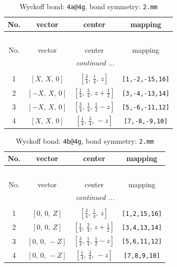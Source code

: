 \documentclass[fleqn,8pt]{jsarticle}
\begin{document}
\begin{longtable}{cccc}
\caption{Wyckoff bond: {\tt 4a@4g}, bond symmetry: {\tt 2.mm}}
 \\
 \hline \hline
No. & vector & center & mapping \\ \hline \endfirsthead

\multicolumn{3}{l}{\tablename\ \thetable{}} \\
 \hline \hline
No. & vector & center & mapping \\ \hline \endhead

 \hline \hline
\multicolumn{3}{r}{\footnotesize\it continued ...} \\ \endfoot

 \hline \hline
\multicolumn{3}{r}{} \\ \endlastfoot

1 & $\left[ X,\, X,\, 0 \right]$ & $\left[ \frac{3}{4},\, \frac{1}{4},\, z \right]$ & {\tt [1,-2,-15,16]} \\ \hline
2 & $\left[ - X,\, X,\, 0 \right]$ & $\left[ \frac{1}{4},\, \frac{3}{4},\, z + \frac{1}{2} \right]$ & {\tt [3,-4,-13,14]} \\ \hline
3 & $\left[ - X,\, X,\, 0 \right]$ & $\left[ \frac{3}{4},\, \frac{1}{4},\, \frac{1}{2} - z \right]$ & {\tt [5,-6,-11,12]} \\ \hline
4 & $\left[ X,\, X,\, 0 \right]$ & $\left[ \frac{1}{4},\, \frac{3}{4},\, - z \right]$ & {\tt [7,-8,-9,10]} \\
\end{longtable}
\renewcommand{\arraystretch}{1.2}
\begin{longtable}{cccc}
\caption{Wyckoff bond: {\tt 4b@4g}, bond symmetry: {\tt 2.mm}}
 \\
 \hline \hline
No. & vector & center & mapping \\ \hline \endfirsthead

\multicolumn{3}{l}{\tablename\ \thetable{}} \\
 \hline \hline
No. & vector & center & mapping \\ \hline \endhead

 \hline \hline
\multicolumn{3}{r}{\footnotesize\it continued ...} \\ \endfoot

 \hline \hline
\multicolumn{3}{r}{} \\ \endlastfoot

1 & $\left[ 0,\, 0,\, Z \right]$ & $\left[ \frac{3}{4},\, \frac{1}{4},\, z \right]$ & {\tt [1,2,15,16]} \\ \hline
2 & $\left[ 0,\, 0,\, Z \right]$ & $\left[ \frac{1}{4},\, \frac{3}{4},\, z + \frac{1}{2} \right]$ & {\tt [3,4,13,14]} \\ \hline
3 & $\left[ 0,\, 0,\, - Z \right]$ & $\left[ \frac{3}{4},\, \frac{1}{4},\, \frac{1}{2} - z \right]$ & {\tt [5,6,11,12]} \\ \hline
4 & $\left[ 0,\, 0,\, - Z \right]$ & $\left[ \frac{1}{4},\, \frac{3}{4},\, - z \right]$ & {\tt [7,8,9,10]} \\
\end{longtable}
\end{document}
